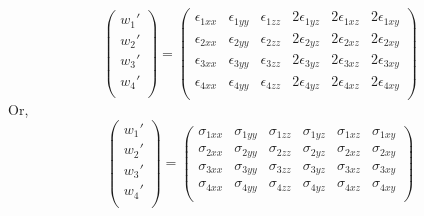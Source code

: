 \begin{equation}
\begin{pmatrix}
{w_1}' \\
{w_2}' \\
{w_3}' \\
{w_4}' \\
\end{pmatrix} = \begin{pmatrix}
\epsilon_{1xx} & \epsilon_{1yy} & \epsilon_{1zz} & 2\epsilon_{1yz} & 2\epsilon_{1xz} & 2\epsilon_{1xy}   \\
\epsilon_{2xx} & \epsilon_{2yy} & \epsilon_{2zz} & 2\epsilon_{2yz} & 2\epsilon_{2xz} & 2\epsilon_{2xy}   \\
\epsilon_{3xx} & \epsilon_{3yy} & \epsilon_{3zz} & 2\epsilon_{3yz} & 2\epsilon_{3xz} & 2\epsilon_{3xy}   \\
\epsilon_{4xx} & \epsilon_{4yy} & \epsilon_{4zz} & 2\epsilon_{4yz} & 2\epsilon_{4xz} & 2\epsilon_{4xy}   \\
\end{pmatrix}
\end{equation}
Or,
\begin{equation}
\begin{pmatrix}
{w_1}' \\
{w_2}' \\
{w_3}' \\
{w_4}' \\
\end{pmatrix} = \begin{pmatrix}
\sigma_{1xx} & \sigma_{1yy} & \sigma_{1zz} & \sigma_{1yz} & \sigma_{1xz} & \sigma_{1xy}   \\
\sigma_{2xx} & \sigma_{2yy} & \sigma_{2zz} & \sigma_{2yz} & \sigma_{2xz} & \sigma_{2xy} \\
\sigma_{3xx} & \sigma_{3yy} & \sigma_{3zz} & \sigma_{3yz} & \sigma_{3xz} & \sigma_{3xy} \\
\sigma_{4xx} & \sigma_{4yy} & \sigma_{4zz} & \sigma_{4yz} & \sigma_{4xz} & \sigma_{4xy}  \\
\end{pmatrix}
\end{equation}

